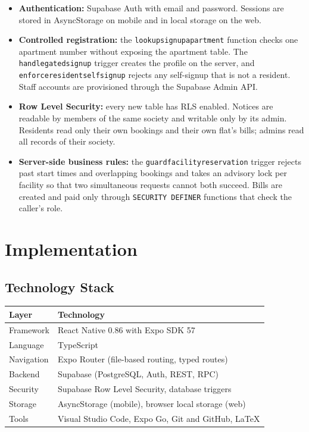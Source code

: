 \documentclass{tietreport}
\renewcommand{\_}{\textunderscore\allowbreak}
\begin{document}
\begin{itemize}
  \item \textbf{Authentication:} Supabase Auth with email and password.
  Sessions are stored in AsyncStorage on mobile and in local storage on the
  web.
  \item \textbf{Controlled registration:} the
  \texttt{lookup\_signup\_apartment} function checks one apartment number
  without exposing the apartment table. The \texttt{handle\_gated\_signup}
  trigger creates the profile on the server, and
  \texttt{enforce\_resident\_self\_signup} rejects any self-signup that is
  not a resident. Staff accounts are provisioned through the Supabase Admin
  API.
  \item \textbf{Row Level Security:} every new table has RLS enabled.
  Notices are readable by members of the same society and writable only by
  its admin. Residents read only their own bookings and their own flat's
  bills; admins read all records of their society.
  \item \textbf{Server-side business rules:} the
  \texttt{guard\_facility\_reservation} trigger rejects past start times and
  overlapping bookings and takes an advisory lock per facility so that two
  simultaneous requests cannot both succeed. Bills are created and paid only
  through \texttt{SECURITY DEFINER} functions that check the caller's role.
\end{itemize}


\section{Implementation}

\subsection{Technology Stack}

\begin{longtable}{L{4cm} L{9.8cm}}
\toprule
\textbf{Layer} & \textbf{Technology} \\
\midrule
\endhead
Framework & React Native 0.86 with Expo SDK 57 \\
Language & TypeScript \\
Navigation & Expo Router (file-based routing, typed routes) \\
Backend & Supabase (PostgreSQL, Auth, REST, RPC) \\
Security & Supabase Row Level Security, database triggers \\
Storage & AsyncStorage (mobile), browser local storage (web) \\
Tools & Visual Studio Code, Expo Go, Git and GitHub, LaTeX \\
\bottomrule
\end{longtable}
\end{document}
